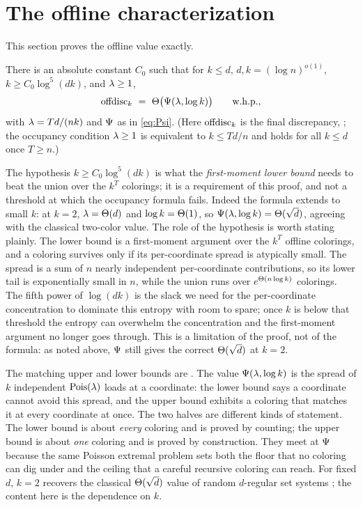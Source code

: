 \section{The offline characterization}\label{sec:offline}

This section proves the offline value exactly.

\begin{theorem}\label{thm:offline}
There is an absolute constant $C_0$ such that for $k\le d$, $d,k=(\log n)^{o(1)}$, $k\ge C_0\log^5(dk)$, and $\lambda\ge1$,
\[
  \mathrm{offdisc}_k\ =\ \Theta\big(\Psi(\lambda,\log k)\big)\qquad\textnormal{w.h.p.},
\]
with $\lambda=Td/(nk)$ and $\Psi$ as in \eqref{eq:Psi}. (Here $\mathrm{offdisc}_k$ is the final discrepancy, ; the
occupancy condition $\lambda\ge1$ is equivalent to $k\le Td/n$ and holds for all $k\le d$ once $T\ge n$.)
\end{theorem}

The hypothesis $k\ge C_0\log^5(dk)$ is what the \emph{first-moment lower bound} needs to beat the union over the $k^T$
colorings; it is a requirement of this proof, and not a threshold at which the occupancy formula fails. Indeed the formula
extends to small $k$: at $k=2$, $\lambda=\Theta(d)$ and $\log k=\Theta(1)$, so $\Psi(\lambda,\log k)=\Theta(\sqrt d)$, agreeing with the
classical two-color value. The role of the hypothesis is worth stating plainly. The lower bound is a first-moment argument over
the $k^T$ offline colorings, and a coloring survives only if its per-coordinate spread is atypically small. The spread is a
sum of $n$ nearly independent per-coordinate contributions, so its lower tail is exponentially small in $n$, while the union
runs over $e^{\Theta(n\log k)}$ colorings. The fifth power of $\log(dk)$ is the slack we need for the per-coordinate
concentration to dominate this entropy with room to spare; once $k$ is below that threshold the entropy can overwhelm the
concentration and the first-moment argument no longer goes through. This is a limitation of the proof, not of the formula:
as noted above, $\Psi$ still gives the correct $\Theta(\sqrt d)$ at $k=2$.

The matching upper and lower bounds are . The value
$\Psi(\lambda,\log k)$ is the spread of $k$ independent $\mathrm{Pois}(\lambda)$ loads at a coordinate: the lower bound says a
coordinate cannot avoid this spread, and the upper bound exhibits a coloring that matches it at every coordinate at once.
The two halves are different kinds of statement. The lower bound is about \emph{every} coloring and is proved by counting;
the upper bound is about \emph{one} coloring and is proved by construction. They meet at $\Psi$ because the same Poisson
extremal problem sets both the floor that no coloring can dig under and the ceiling that a careful recursive coloring can
reach. For fixed $d$, $k=2$ recovers the classical $\Theta(\sqrt d)$ value of random $d$-regular set systems
\cite{BansalMeka2019,EzraLovett2016,HobergRothvoss2019}; the content here is the dependence on $k$.

